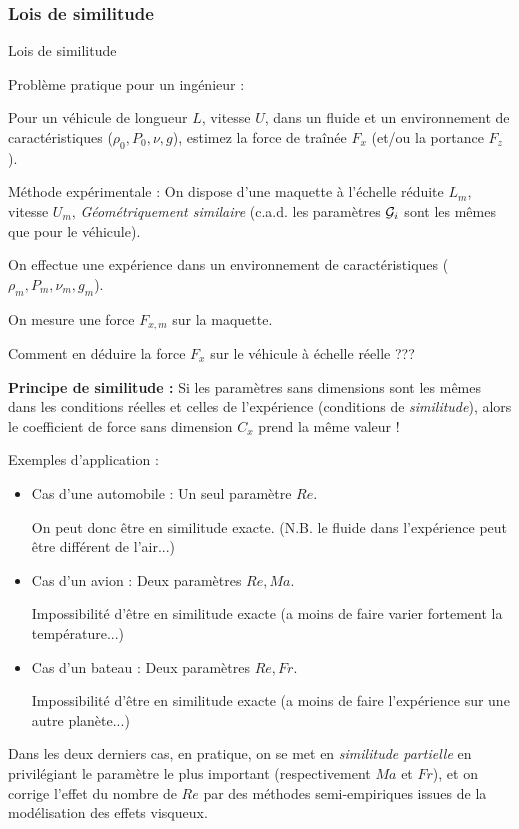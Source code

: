 \subsubsection{Lois de similitude}
\begin{frame}{Lois de similitude}

\small

Problème pratique pour un ingénieur : 

Pour un véhicule de longueur $L$, vitesse $U$, dans un fluide et un environnement de caractéristiques ($\rho_0,P_0,\nu,g$), estimez la force de traînée $F_x$ (et/ou la portance $F_z$).

\pause
\medskip

Méthode expérimentale : On dispose d'une maquette à l'échelle réduite 
$L_m$,  vitesse $U_m$, {\em Géométriquement similaire} (c.a.d. les paramètres ${\cal G}_i$ sont les mêmes que pour le véhicule). 

On effectue une expérience dans un environnement de caractéristiques ($\rho_m,P_m,\nu_m,g_m$).

\smallskip

On mesure une force $F_{x,m}$ sur la maquette. 
\smallskip

Comment en déduire la force $F_x$ sur le véhicule à échelle réelle ???

\pause
\medskip


{\bf Principe de similitude :} 
Si les paramètres sans dimensions sont les mêmes dans les conditions réelles et celles de l'expérience (conditions de {\em similitude}), alors le coefficient de force sans dimension $C_x$ prend la même valeur !

\pause
\medskip

Exemples d'application :
\begin{itemize}

\item Cas d'une automobile : Un seul paramètre $Re$. 

On peut donc être en similitude exacte. (N.B. le fluide dans l'expérience peut être différent de l'air...)

\item Cas d'un avion : Deux paramètres $Re, Ma$. 

Impossibilité d'être en similitude exacte (a moins de faire varier fortement la température...)

\item Cas d'un bateau :  Deux paramètres $Re, Fr$. 

Impossibilité d'être en similitude exacte (a moins de faire l'expérience sur une autre planète...)

\end{itemize}


\pause
\medskip

Dans les deux derniers cas, en pratique, on se met en {\em similitude partielle } en privilégiant le paramètre le plus important (respectivement $Ma$ et $Fr$), et on corrige l'effet du nombre de $Re$ par des méthodes semi-empiriques issues de la modélisation des effets visqueux.

\end{frame}



